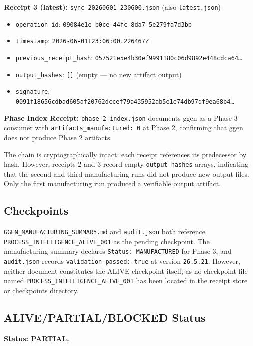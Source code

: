 \textbf{Receipt 3 (latest):} \texttt{sync-20260601-230600.json} (also \texttt{latest.json})
\begin{itemize}
  \item \texttt{operation\_id}: \texttt{09084e1e-b0ce-44fc-8da7-5e279fa7d3bb}
  \item \texttt{timestamp}: \texttt{2026-06-01T23:06:00.226467Z}
  \item \texttt{previous\_receipt\_hash}: \texttt{057521e5e4b30ef9991180c06d9892e448cdca64\ldots}
  \item \texttt{output\_hashes}: \texttt{[]} (empty --- no new artifact output)
  \item \texttt{signature}: \texttt{0091f18656cdbad605af20762dccef79a435952ab5e1e74db97df9ea68b4\ldots}
\end{itemize}

\textbf{Phase Index Receipt:} \texttt{phase-2-index.json} documents ggen as a Phase 3 consumer
with \texttt{artifacts\_manufactured: 0} at Phase 2, confirming that ggen does not produce Phase
2 artifacts.

The chain is cryptographically intact: each receipt references its predecessor by hash. However,
receipts 2 and 3 record empty \texttt{output\_hashes} arrays, indicating that the second and
third manufacturing runs did not produce new output files. Only the first manufacturing run
produced a verifiable output artifact.

\subsection{Checkpoints}
\label{sec:ggen-evidence-checkpoints}

\texttt{GGEN\_MANUFACTURING\_SUMMARY.md} and \texttt{audit.json} both reference
\texttt{PROCESS\_INTELLIGENCE\_ALIVE\_001} as the pending checkpoint. The manufacturing summary
declares \texttt{Status: MANUFACTURED} for Phase 3, and \texttt{audit.json} records
\texttt{validation\_passed: true} at version \texttt{26.5.21}. However, neither document
constitutes the ALIVE checkpoint itself, as no checkpoint file named
\texttt{PROCESS\_INTELLIGENCE\_ALIVE\_001} has been located in the receipt store or checkpoints
directory.

\subsection{ALIVE/PARTIAL/BLOCKED Status}
\label{sec:ggen-evidence-status}

\textbf{Status: PARTIAL.}

